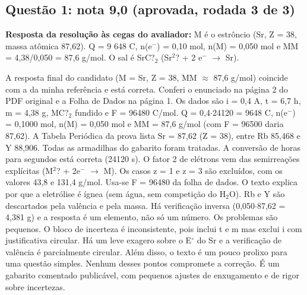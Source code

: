 \documentclass{article}%
\begin{document}
\subsection*{Questão 1: nota 9,0 (aprovada, rodada 3 de 3)}%
\textbf{Resposta da resolução às cegas do avaliador:} M é o estrôncio (Sr, Z = 38, massa atômica 87,62). Q = 9 648 C, n(e$^{-}$) = 0,10 mol, n(M) = 0,050 mol e MM = 4,38/0,050 = 87,6 g/mol. O sal é SrC?$_{2}$ (Sr$^2$? + 2 e$^{-}$ $\to$ Sr).\par %
A resposta final do candidato (M = Sr, Z = 38, MM $\approx$ 87,6 g/mol) coincide com a da minha referência e está correta. Conferi o enunciado na página 2 do PDF original e a Folha de Dados na página 1. Os dados são i = 0,4 A, t = 6,7 h, m = 4,38 g, MC?$_{2}$ fundido e F = 96480 C/mol. Q = 0,4$\cdot$24120 = 9648 C, n(e$^{-}$) = 0,1000 mol, n(M) = 0,050 mol e MM = 87,6 g/mol (com F = 96500 daria 87,62). A Tabela Periódica da prova lista Sr = 87,62 (Z = 38), entre Rb 85,468 e Y 88,906. Todas as armadilhas do gabarito foram tratadas. A conversão de horas para segundos está correta (24120 s). O fator 2 de elétrons vem das semirreações explícitas (M$^2$? + 2e$^{-}$ $\to$ M). Os casos z = 1 e z = 3 são excluídos, com os valores 43,8 e 131,4 g/mol. Usa{-}se F = 96480 da folha de dados. O texto explica por que a eletrólise é ígnea (sem água, sem competição do H$_{2}$O). Rb e Y são descartados pela valência e pela massa. Há verificação inversa (0,050$\cdot$87,62 = 4,381 g) e a resposta é um elemento, não só um número. Os problemas são pequenos. O bloco de incerteza é inconsistente, pois inclui t e m mas exclui i com justificativa circular. Há um leve exagero sobre o E$^\circ$ do Sr e a verificação de valência é parcialmente circular. Além disso, o texto é um pouco prolixo para uma questão simples. Nenhum desses pontos compromete a correção. É um gabarito comentado publicável, com pequenos ajustes de enxugamento e de rigor sobre incertezas.%
\end{document}
